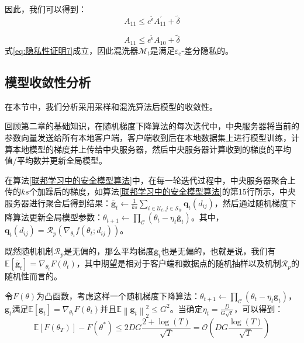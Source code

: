 因此，我们可以得到：
\begin{equation}\label{隐私性证明8}
A_{11} \leq e^{\tilde{\epsilon}} A_{11}^{\prime}+\tilde{\delta}
\end{equation}

\begin{equation}\label{隐私性证明9}
A_{11} \leq e^{\tilde{\epsilon}} A_{10}+\tilde{\delta}
\end{equation}
式\ref{eq:隐私性证明7}成立，因此混洗器$\mathcal{M}_{t}$是满足$\varepsilon_{\mathrm{c}}$-差分隐私的。

\subsection{模型收敛性分析}
在本节中，我们分析采用采样和混洗算法后模型的收敛性。

回顾第二章的基础知识，在随机梯度下降算法的每次迭代中，中央服务器将当前的参数向量发送给所有本地客户端，客户端收到后在本地数据集上进行模型训练，计算本地模型的梯度并上传给中央服务器，然后中央服务器计算收到的梯度的平均值/平均数并更新全局模型。

在算法\ref{联邦学习中的安全模型算法}中，在每一轮迭代过程中，中央服务器聚合上传的$ks$个加躁后的梯度，如算法\ref{联邦学习中的安全模型算法}的第15行所示，中央服务器进行聚合后得到结果：$\overline{\mathbf{g}}_{t} \leftarrow \frac{1}{k s} \sum_{i \in \mathcal{U}_{t}, j \in \mathcal{S}_{i t}} \boldsymbol{q}_{t}\left(d_{i j}\right)$，然后通过随机梯度下降算法更新全局模型参数：$\theta_{t+1} \leftarrow \prod_{\mathcal{C}}\left(\theta_{t}-\eta_{t} \overline{\mathbf{g}}_{t}\right)$。其中，$\mathbf{q}_{t}\left(d_{i j}\right)=\mathcal{R}_{p}\left(\nabla_{\theta_{t}} f\left(\theta_{t} ; d_{i j}\right)\right)$。

既然随机机制$\mathcal{R}_{p}$是无偏的，那么平均梯度$\overline{\mathbf{g}}_{t}$也是无偏的，也就是说，我们有 $\mathbb{E}\left[\overline{\mathbf{g}}_{t}\right]=\nabla_{\theta_{t}} F\left(\theta_{t}\right)$，其中期望是相对于客户端和数据点的随机抽样以及机制$\mathcal{R}_{p}$的随机性而言的。

令$F(\theta)$为凸函数，考虑这样一个随机梯度下降算法：$\theta_{t+1} \leftarrow \prod_{\mathcal{C}}\left(\theta_{t}-\eta_{t} \mathbf{g}_{t}\right)$，$\mathbf{g}_{t}$满足$\mathbb{E}\left[\mathbf{g}_{t}\right]=\nabla_{\theta_{t}} F\left(\theta_{t}\right)$并且$\mathbb{E}\left\|\mathbf{g}_{t}\right\|_{2}^{2} \leq G^{2}$。当确定$\eta_{t}=\frac{D}{G \sqrt{t}}$，可以得到：
\begin{equation}\label{eq：模型收敛性证明1}
\mathbb{E}\left[F\left(\theta_{T}\right)\right]-F\left(\theta^{*}\right) \leq 2 D G \frac{2+\log (T)}{\sqrt{T}}=\mathcal{O}\left(D G \frac{\log (T)}{\sqrt{T}}\right)
\end{equation} 

